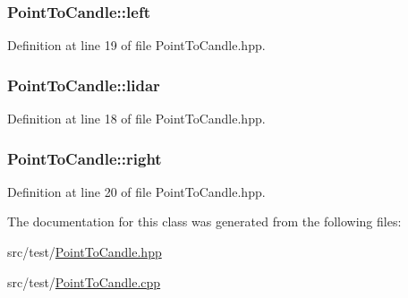 \hypertarget{classPointToCandle_a8976db9c7a0e1484762bf27c829cb06f}{
\subsubsection[{left}]{ Point\-To\-Candle\-::left\hspace{0.3cm}{\ttfamily [private]}}}\label{classPointToCandle_a8976db9c7a0e1484762bf27c829cb06f}


Definition at line 19 of file Point\-To\-Candle.\-hpp.

\hypertarget{classPointToCandle_a74def04bd7985f1ae2dfb83cb4ad7d40}{
\subsubsection[{lidar}]{ Point\-To\-Candle\-::lidar\hspace{0.3cm}{\ttfamily [private]}}}\label{classPointToCandle_a74def04bd7985f1ae2dfb83cb4ad7d40}


Definition at line 18 of file Point\-To\-Candle.\-hpp.

\hypertarget{classPointToCandle_ad0913e5dfa04c7205c16cc893ff238c5}{
\subsubsection[{right}]{ Point\-To\-Candle\-::right\hspace{0.3cm}{\ttfamily [private]}}}\label{classPointToCandle_ad0913e5dfa04c7205c16cc893ff238c5}


Definition at line 20 of file Point\-To\-Candle.\-hpp.



The documentation for this class was generated from the following files\-:\begin{DoxyCompactItemize}
\item 
src/test/\hyperlink{PointToCandle_8hpp}{Point\-To\-Candle.\-hpp}\item 
src/test/\hyperlink{PointToCandle_8cpp}{Point\-To\-Candle.\-cpp}\end{DoxyCompactItemize}
